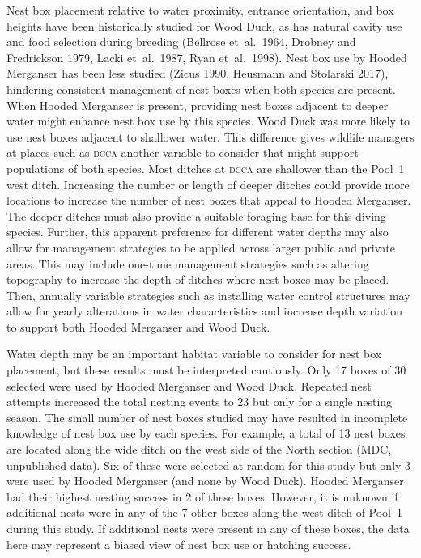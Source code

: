 Nest box placement relative to water proximity, entrance orientation, and box heights have been historically studied for Wood Duck, as has natural cavity use and food selection during breeding (Bellrose et~al.~1964, Drobney and Fredrickson 1979, Lacki et~al.~1987, Ryan et~al.~1998). Nest box use by Hooded Merganser has been less studied (Zicus 1990, Heusmann and Stolarski 2017), hindering consistent management of nest boxes when both species are present. When Hooded Merganser is present, providing nest boxes adjacent to deeper water might enhance nest box use by this species. Wood Duck was more likely to use nest boxes adjacent to shallower water. This difference gives wildlife managers at places such as \textsc{dcca} another variable to consider that might support populations of both species. Most ditches at \textsc{dcca} are shallower than the Pool~1 west ditch. Increasing the number or length of deeper ditches could provide more locations to increase the number of nest boxes that appeal to Hooded Merganser. The deeper ditches must also provide a suitable foraging base for this diving species. Further, this apparent preference for different water depths may also allow for management strategies to be applied across larger public and private areas. This may include one-time management strategies such as altering topography to increase the depth of ditches where nest boxes may be placed. Then, annually variable strategies such as installing water control structures may allow for yearly alterations in water characteristics and increase depth variation to support both Hooded Merganser and Wood Duck.  

Water depth may be an important habitat variable to consider for nest box placement, but these results must be interpreted cautiously. Only 17 boxes of 30 selected were used by Hooded Merganser and Wood Duck. Repeated nest attempts increased the total nesting events to 23 but only for a single nesting season. The small number of nest boxes studied may have resulted in incomplete knowledge of nest box use by each species. For example, a total of 13 nest boxes are located along the wide ditch on the west side of the North section (MDC, unpublished data). Six of these were selected at random for this study but only 3 were used by Hooded Merganser (and none by Wood Duck). Hooded Merganser had their highest nesting success in 2 of these boxes. However, it is unknown if additional nests were in any of the 7 other boxes along the west ditch of Pool~1 during this study. If additional nests were present in any of these boxes, the data here may represent a biased view of nest box use or hatching success. 

